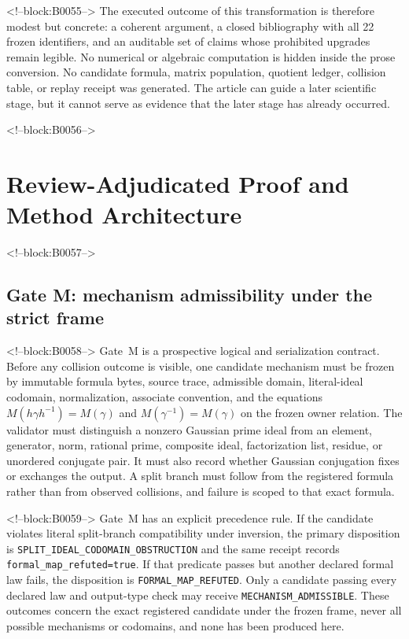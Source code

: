 \documentclass[11pt,a4paper]{article}
\begin{document}
<!--block:B0055-->
The executed outcome of this transformation is therefore modest but concrete: a coherent argument, a closed bibliography with all 22 frozen identifiers, and an auditable set of claims whose prohibited upgrades remain legible. No numerical or algebraic computation is hidden inside the prose conversion. No candidate formula, matrix population, quotient ledger, collision table, or replay receipt was generated. The article can guide a later scientific stage, but it cannot serve as evidence that the later stage has already occurred.

<!--block:B0056-->
\section{Review-Adjudicated Proof and Method Architecture}

<!--block:B0057-->
\subsection{Gate M: mechanism admissibility under the strict frame}

<!--block:B0058-->
Gate~M is a prospective logical and serialization contract. Before any collision outcome is visible, one candidate mechanism must be frozen by immutable formula bytes, source trace, admissible domain, literal-ideal codomain, normalization, associate convention, and the equations \(M(h\gamma h^{-1})=M(\gamma)\) and \(M(\gamma^{-1})=M(\gamma)\) on the frozen owner relation. The validator must distinguish a nonzero Gaussian prime ideal from an element, generator, norm, rational prime, composite ideal, factorization list, residue, or unordered conjugate pair. It must also record whether Gaussian conjugation fixes or exchanges the output. A split branch must follow from the registered formula rather than from observed collisions, and failure is scoped to that exact formula.

<!--block:B0059-->
Gate~M has an explicit precedence rule. If the candidate violates literal split-branch compatibility under inversion, the primary disposition is \texttt{SPLIT\_IDEAL\_CODOMAIN\_OBSTRUCTION} and the same receipt records \texttt{formal\_map\_refuted=true}. If that predicate passes but another declared formal law fails, the disposition is \texttt{FORMAL\_MAP\_REFUTED}. Only a candidate passing every declared law and output-type check may receive \texttt{MECHANISM\_ADMISSIBLE}. These outcomes concern the exact registered candidate under the frozen frame, never all possible mechanisms or codomains, and none has been produced here.
\end{document}
